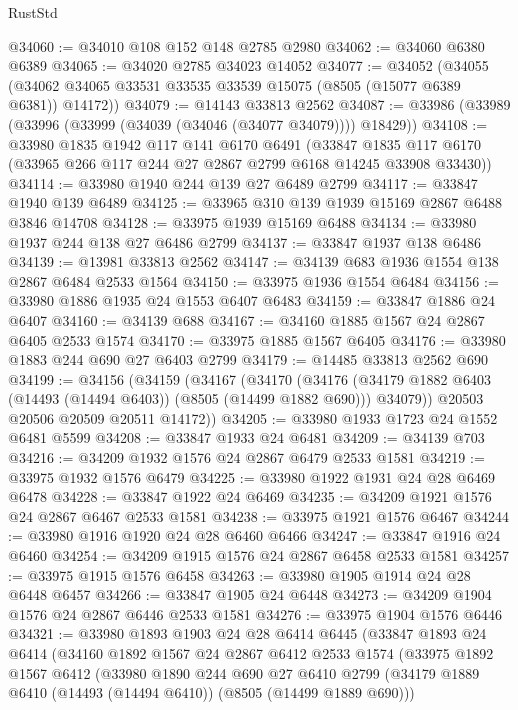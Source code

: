 \begin{lexlean}{RustStd}
\begin{coremodule}
@34060 := @34010 @108 @152 @148 @2785 @2980
@34062 := @34060 @6380 @6389
@34065 := @34020 @2785 @34023 @14052
@34077 := @34052
    (@34055 (@34062 @34065 @33531 @33535 @33539 @15075 (@8505 (@15077 @6389 @6381)) @14172))
@34079 := @14143 @33813 @2562
@34087 := @33986 (@33989 (@33996 (@33999 (@34039 (@34046 (@34077 @34079)))) @18429))
@34108 := @33980
    @1835
    @1942
    @117
    @141
    @6170
    @6491
    (@33847 @1835 @117 @6170 (@33965 @266 @117 @244 @27 @2867 @2799 @6168 @14245 @33908 @33430))
@34114 := @33980 @1940 @244 @139 @27 @6489 @2799
@34117 := @33847 @1940 @139 @6489
@34125 := @33965 @310 @139 @1939 @15169 @2867 @6488 @3846 @14708
@34128 := @33975 @1939 @15169 @6488
@34134 := @33980 @1937 @244 @138 @27 @6486 @2799
@34137 := @33847 @1937 @138 @6486
@34139 := @13981 @33813 @2562
@34147 := @34139 @683 @1936 @1554 @138 @2867 @6484 @2533 @1564
@34150 := @33975 @1936 @1554 @6484
@34156 := @33980 @1886 @1935 @24 @1553 @6407 @6483
@34159 := @33847 @1886 @24 @6407
@34160 := @34139 @688
@34167 := @34160 @1885 @1567 @24 @2867 @6405 @2533 @1574
@34170 := @33975 @1885 @1567 @6405
@34176 := @33980 @1883 @244 @690 @27 @6403 @2799
@34179 := @14485 @33813 @2562 @690
@34199 := @34156
    (@34159
      (@34167
        (@34170
          (@34176 (@34179 @1882 @6403 (@14493 (@14494 @6403)) (@8505 (@14499 @1882 @690))) @34079))
        @20503
        @20506
        @20509
        @20511
        @14172))
@34205 := @33980 @1933 @1723 @24 @1552 @6481 @5599
@34208 := @33847 @1933 @24 @6481
@34209 := @34139 @703
@34216 := @34209 @1932 @1576 @24 @2867 @6479 @2533 @1581
@34219 := @33975 @1932 @1576 @6479
@34225 := @33980 @1922 @1931 @24 @28 @6469 @6478
@34228 := @33847 @1922 @24 @6469
@34235 := @34209 @1921 @1576 @24 @2867 @6467 @2533 @1581
@34238 := @33975 @1921 @1576 @6467
@34244 := @33980 @1916 @1920 @24 @28 @6460 @6466
@34247 := @33847 @1916 @24 @6460
@34254 := @34209 @1915 @1576 @24 @2867 @6458 @2533 @1581
@34257 := @33975 @1915 @1576 @6458
@34263 := @33980 @1905 @1914 @24 @28 @6448 @6457
@34266 := @33847 @1905 @24 @6448
@34273 := @34209 @1904 @1576 @24 @2867 @6446 @2533 @1581
@34276 := @33975 @1904 @1576 @6446
@34321 := @33980
    @1893
    @1903
    @24
    @28
    @6414
    @6445
    (@33847
      @1893
      @24
      @6414
      (@34160
        @1892
        @1567
        @24
        @2867
        @6412
        @2533
        @1574
        (@33975
          @1892
          @1567
          @6412
          (@33980
            @1890
            @244
            @690
            @27
            @6410
            @2799
            (@34179 @1889 @6410 (@14493 (@14494 @6410)) (@8505 (@14499 @1889 @690)))

\end{coremodule}
\end{lexlean}

